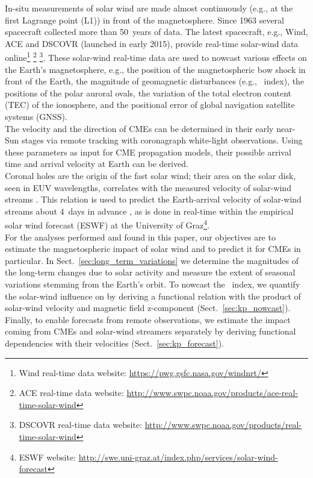 In-situ measurements of solar wind are made almost continuously (e.g., at the first Lagrange point (L1)) in front of the magnetosphere. Since 1963 several spacecraft collected more than 50~years of data. The latest spacecraft, e.g., Wind, ACE and DSCOVR (launched in early 2015), provide real-time solar-wind data online\footnote{Wind real-time data website: \url{https://pwg.gsfc.nasa.gov/windnrt/}} \footnote{ACE real-time data website: \url{http://www.swpc.noaa.gov/products/ace-real-time-solar-wind}} \footnote{DSCOVR real-time data website: \url{http://www.swpc.noaa.gov/products/real-time-solar-wind}}.
These solar-wind real-time data are used to nowcast various effects on the Earth's magnetosphere, e.g., the position of the magnetospheric bow shock in front of the Earth, the magnitude of geomagnetic disturbances (e.g., \Kp~index), the positions of the polar auroral ovals, the variation of the total electron content (TEC) of the ionosphere, and the positional error of global navigation satellite systems (GNSS).\\


The velocity and the direction of CMEs can be determined in their early near-Sun stages via remote tracking with coronagraph white-light observations. Using these parameters as input for CME propagation models, their possible arrival time and arrival velocity at Earth can be derived.\\

Coronal holes are the origin of the fast solar wind; their area on the solar disk, seen in EUV wavelengths, correlates with the measured velocity of solar-wind streams \citep{Vrsnak2007}. This relation is used to predict the Earth-arrival velocity of solar-wind streams about 4~days in advance \citep{Rotter2012}, as is done in real-time within the empirical solar wind forecast (ESWF) at the University of Graz\footnote{ESWF website: \url{http://swe.uni-graz.at/index.php/services/solar-wind-forecast}}.\\

For the analyses performed and found in this paper, our objectives are to estimate the magnetospheric impact of solar wind and to predict it for CMEs in particular. In Sect.~\ref{sec:long_term_variations} we determine the magnitudes of the long-term \Kp{} changes due to solar activity and measure the extent of seasonal variations stemming from the Earth's orbit. To nowcast the \Kp{}~index, we quantify the solar-wind influence on \Kp{} by deriving a functional relation with the product of solar-wind velocity and magnetic field z-component (Sect.~\ref{sec:kp_nowcast}). Finally, to enable \Kp{} forecasts from remote observations, we estimate the \Kp{} impact coming from CMEs and solar-wind streamers separately by deriving functional dependencies with their velocities (Sect.~\ref{sec:kp_forecast}).


